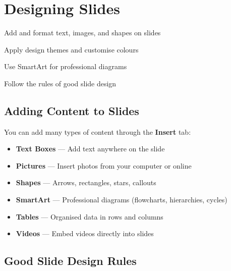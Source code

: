 \chapter{Designing Slides}
\label{ch:ppt-design}

\begin{objectives}
  \item Add and format text, images, and shapes on slides
  \item Apply design themes and customise colours
  \item Use SmartArt for professional diagrams
  \item Follow the rules of good slide design
\end{objectives}


\section{Adding Content to Slides}
\label{sec:add-content}

You can add many types of content through the \textbf{Insert} tab:

\begin{itemize}[leftmargin=*, label={\textcolor{ModuleBlue}{\faAngleRight}}, itemsep=3pt]
  \item \textbf{Text Boxes} --- Add text anywhere on the slide
  \item \textbf{Pictures} --- Insert photos from your computer or online
  \item \textbf{Shapes} --- Arrows, rectangles, stars, callouts
  \item \textbf{SmartArt} --- Professional diagrams (flowcharts, hierarchies, cycles)
  \item \textbf{Tables} --- Organised data in rows and columns
  \item \textbf{Videos} --- Embed videos directly into slides
\end{itemize}

\section{Good Slide Design Rules}
\label{sec:design-rules}

